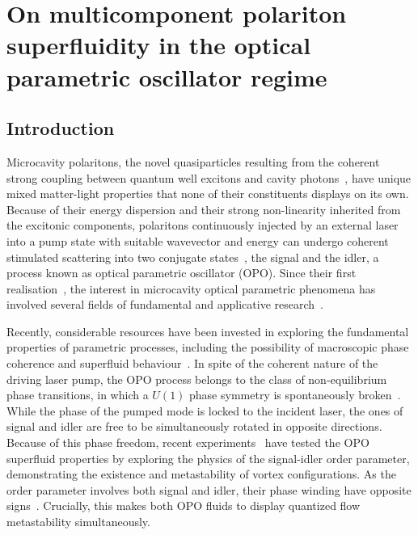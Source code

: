 \chapter{On multicomponent polariton superfluidity in the optical
  parametric oscillator regime}
\label{cha:opo}


\section{Introduction}
%
Microcavity polaritons, the novel quasiparticles resulting from the
coherent strong coupling between quantum well excitons and cavity
photons~\cite{9780199228942}, have unique mixed matter-light
properties that none of their constituents displays on its
own. Because of their energy dispersion and their strong non-linearity
inherited from the excitonic components, polaritons continuously
injected by an external laser into a pump state with suitable
wavevector and energy can undergo coherent stimulated scattering into
two conjugate states~\cite{Ciuti_2000,Ciuti_2001,Ciuti_2003}, the signal
and the idler, a process known as optical parametric oscillator (OPO).
%
Since their first
realisation~\cite{Stevenson_2000,Savvidis_2000,Savvidis_2000_b,Baumberg_2000,Saba_2001},
the interest in microcavity optical parametric phenomena has involved
several fields of fundamental and applicative
research~\cite{Edamatsu_2004,Savasta_2005,Lanco_2006,Abbarchi_2011,Ardizzone_2012,Xie_2012,Lecomte_2013}.

Recently, considerable resources have been invested in exploring the
fundamental properties of parametric processes, including the
possibility of macroscopic phase coherence and superfluid
behaviour~\cite{Carusotto_2013}.
%
In spite of the coherent nature of the driving laser pump, the OPO
process belongs to the class of non-equilibrium phase transitions, in
which a $U(1)$ phase symmetry is spontaneously
broken~\cite{Wouters_2007}.
%
While the phase of the pumped mode is locked to the incident laser,
the ones of signal and idler are free to be simultaneously rotated in
opposite directions.
%
Because of this phase freedom, recent experiments~\cite{Sanvitto_2010}
have tested the OPO superfluid properties by exploring the physics of
the signal-idler order parameter, demonstrating the existence and
metastability of vortex configurations. As the order parameter
involves both signal and idler, their phase winding have opposite
signs~\cite{Sanvitto_2010,Marchetti_2010,9783642241857}.  Crucially, this
makes both OPO fluids to display quantized flow metastability
simultaneously.

